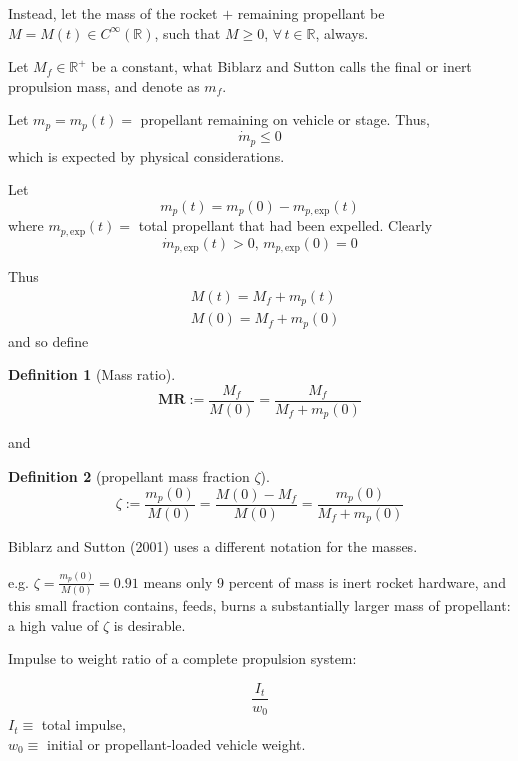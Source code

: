 \documentclass[10pt]{amsart}
\newtheorem{definition}{Definition}
\begin{document}
\begin{multicols*}{2}
Instead, let the mass of the rocket $+$ remaining propellant be $M = M(t) \in C^{\infty}(\mathbb{R})$, such that $M \geq 0$, $\forall \, t \in \mathbb{R}$, always.

Let $M_f \in \mathbb{R}^+$ be a constant, what Biblarz and Sutton calls the final or inert propulsion mass, and denote as $m_f$.

Let $m_p = m_p(t) = $ propellant remaining on vehicle or stage. Thus,
\begin{equation}
\dot{m}_p \leq 0 
\end{equation}
which is expected by physical considerations.

Let 
\begin{equation}
m_p(t)  = m_p(0) - m_{p,\text{exp}}(t)
\end{equation}
where $m_{p,\text{exp}}(t) = $ total propellant that had been expelled. Clearly
\begin{equation}
\dot{m}_{p, \text{exp}}(t) > 0, \, m_{p,\text{exp}}(0) = 0
\end{equation}

Thus
\begin{equation}
\begin{aligned} 
& M(t) = M_f + m_p(t)  \\
& M(0) = M_f + m_p(0)
\end{aligned}
\end{equation}
and so define
\begin{definition}[Mass ratio]
\begin{equation}
\mathbf{MR} := \frac{M_f}{M(0)}	= \frac{M_f}{ M_f + m_p(0)}
\end{equation}
	\end{definition} 
and 
\begin{definition}[propellant mass fraction $\zeta$]
	\begin{equation}
	\zeta := \frac{m_p(0)}{ M(0)} = \frac{M(0) - M_f}{M(0)} = \frac{m_p(0)}{M_f + m_p(0)}
	\end{equation}
	\end{definition}
Biblarz and Sutton (2001) uses a different notation for the masses.

e.g. $\zeta = \frac{m_p(0)}{ M(0)} = 0.91$ means only 9 percent of mass is inert rocket hardware, and this small fraction contains, feeds, burns a substantially larger mass of propellant: a high value of $\zeta$ is desirable.

Impulse to weight ratio of a complete propulsion system:

\[
\frac{I_t}{w_0}
\]
$I_t \equiv $ total impulse, \\
$w_0 \equiv $ initial or propellant-loaded vehicle weight.


\end{multicols*}
\end{document}
